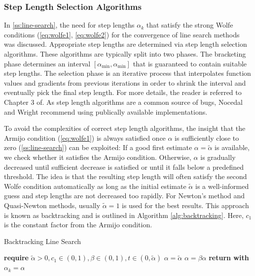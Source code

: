 \subsubsection{Step Length Selection Algorithms}\label{sss:step-length-selection}
In \cref{ss:line-search}, the need for step lengths $\alpha_k$ that satisfy the strong Wolfe conditions (\cref{eq:wolfe1}, \cref{eq:wolfe2})
for the convergence of line search methods was discussed. Appropriate step lengths are determined via step length selection algorithms. 
These algorithms are typically
split into two phases. The bracketing phase determines an interval $[\alpha_{\text{min}}, \alpha_{\text{min}}]$ that is 
guaranteed to contain suitable step lengths. The selection phase is an iterative process that interpolates function values and gradients 
from previous iterations in order to shrink the interval and eventually pick the final step length. For more details, the reader is 
referred to Chapter 3 of. As step length algorithms are a common source of bugs, Nocedal and Wright recommend using publically 
available implementations.

To avoid the complexities of correct step length algorithms, the insight that the Armijo condition (\cref{eq:wolfe1}) is always satisfied 
once $\alpha$ is sufficiently close to zero (\cref{ss:line-search}) can be exploited: If a good first estimate $\alpha = 
\tilde{\alpha}$ is available,
we check whether it satisfies the Armijo condition. Otherwise, $\alpha$ is gradually decreased until sufficient decrease is satisfied or until
it falls below a predefined threshold. The idea is that the resulting step length will often satisfy the second Wolfe condition automatically 
as long as the initial estimate $\tilde{\alpha}$ is a well-informed guess and step lengths are not decreased too rapidly. For Newton's method
and Quasi-Newton methods, usually $\tilde{\alpha} = 1$ is used for the best results. This approach is known
as backtracking and is outlined in Algorithm \ref{alg:backtracking}. Here, $c_1$ is the constant factor from the Armijo condition.

\begin{algorithm}
\caption{Backtracking Line Search}\label{alg:backtracking}
\begin{algorithmic}
\State \textbf{require } $\tilde{\alpha} > 0, c_1 \in (0, 1), \beta \in (0, 1), t \in (0, \tilde{\alpha})$
\State $\alpha = \tilde{\alpha}$
\State $\alpha = \beta \alpha$
\EndWhile
\State \textbf{return with } $\alpha_k = \alpha$
\EndProcedure
\end{algorithmic}
\end{algorithm}

